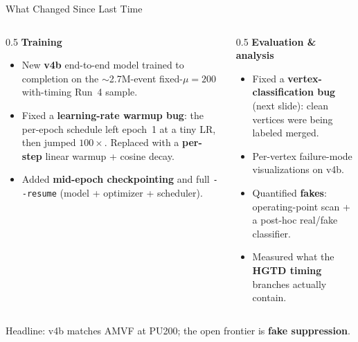 \documentclass[xcolor=table,aspectratio=169]{beamer}
\begin{document}
\begin{frame}{What Changed Since Last Time}
    \begin{columns}[t]
        \begin{column}{0.5\linewidth}
            \small
            \textbf{Training}
            \begin{itemize}\setlength\itemsep{0.3em}
                \item New \textbf{v4b} end-to-end model trained to completion on the
                $\sim$2.7M-event fixed-$\mu{=}200$ with-timing Run~4 sample.
                \item Fixed a \textbf{learning-rate warmup bug}: the per-epoch
                schedule left epoch~1 at a tiny LR, then jumped $100\times$.
                Replaced with a \textbf{per-step} linear warmup + cosine decay.
                \item Added \textbf{mid-epoch checkpointing} and full
                \texttt{-{}-resume} (model + optimizer + scheduler).
            \end{itemize}
        \end{column}
        \begin{column}{0.5\linewidth}
            \small
            \textbf{Evaluation \& analysis}
            \begin{itemize}\setlength\itemsep{0.3em}
                \item Fixed a \textbf{vertex-classification bug} (next slide):
                clean vertices were being labeled merged.
                \item Per-vertex failure-mode visualizations on v4b.
                \item Quantified \textbf{fakes}: operating-point scan + a
                post-hoc real/fake classifier.
                \item Measured what the \textbf{HGTD timing} branches actually
                contain.
            \end{itemize}
        \end{column}
    \end{columns}
    \vspace{0.3em}
    \centering
    {\footnotesize\textcolor{black!60}{Headline: v4b matches AMVF at PU200; the open frontier is \textbf{fake suppression}.}}
\end{frame}
\end{document}
